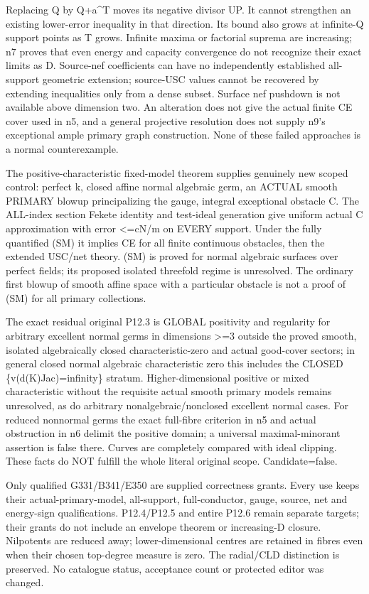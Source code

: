 \documentclass[11pt]{article}
\begin{document}
Replacing Q by Q+a\textasciicircum{}T moves its negative divisor UP. It cannot strengthen an existing lower-error inequality in that direction. Its bound also grows at infinite-Q support points as T grows. Infinite maxima or factorial suprema are increasing; n7 proves that even energy and capacity convergence do not recognize their exact limits as D. Source-nef coefficients can have no independently established all-support geometric extension; source-USC values cannot be recovered by extending inequalities only from a dense subset. Surface nef pushdown is not available above dimension two. An alteration does not give the actual finite CE cover used in n5, and a general projective resolution does not supply n9's exceptional ample primary graph construction. None of these failed approaches is a normal counterexample.

The positive-characteristic fixed-model theorem supplies genuinely new scoped control: perfect k, closed affine normal algebraic germ, an ACTUAL smooth PRIMARY blowup principalizing the gauge, integral exceptional obstacle C. The ALL-index section Fekete identity and test-ideal generation give uniform actual C approximation with error <=cN/m on EVERY support. Under the fully quantified (SM) it implies CE for all finite continuous obstacles, then the extended USC/net theory. (SM) is proved for normal algebraic surfaces over perfect fields; its proposed isolated threefold regime is unresolved. The ordinary first blowup of smooth affine space with a particular obstacle is not a proof of (SM) for all primary collections.

The exact residual original P12.3 is GLOBAL positivity and regularity for arbitrary excellent normal germs in dimensions >=3 outside the proved smooth, isolated algebraically closed characteristic-zero and actual good-cover sectors; in general closed normal algebraic characteristic zero this includes the CLOSED \{v(d(K)Jac)=infinity\} stratum. Higher-dimensional positive or mixed characteristic without the requisite actual smooth primary models remains unresolved, as do arbitrary nonalgebraic/nonclosed excellent normal cases. For reduced nonnormal germs the exact full-fibre criterion in n5 and actual obstruction in n6 delimit the positive domain; a universal maximal-minorant assertion is false there. Curves are completely compared with ideal clipping. These facts do NOT fulfill the whole literal original scope. Candidate=false.

Only qualified G331/B341/E350 are supplied correctness grants. Every use keeps their actual-primary-model, all-support, full-conductor, gauge, source, net and energy-sign qualifications. P12.4/P12.5 and entire P12.6 remain separate targets; their grants do not include an envelope theorem or increasing-D closure. Nilpotents are reduced away; lower-dimensional centres are retained in fibres even when their chosen top-degree measure is zero. The radial/CLD distinction is preserved. No catalogue status, acceptance count or protected editor was changed.
\end{document}
